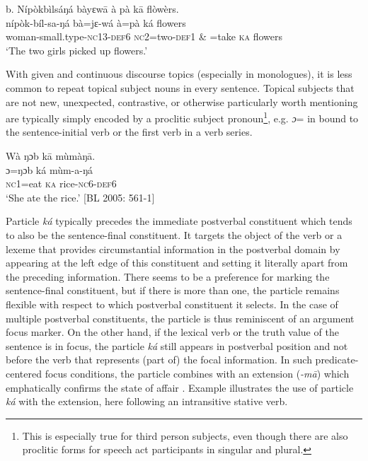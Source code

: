 \documentclass[output=paper]{langsci/langscibook}
\begin{document}
\ea
\glll   \textup{b.}  Nípòkbìlsáŋá  bàyɛw\={a}  à  pà  k\={a}  flòwèrs.\\
     nípòk-bíl-sa-ŋá  bà=jɛ-wá  à=pà  ká  flowers\\
     woman-small.type-\textsc{nc}13-\textsc{def}6  \textsc{nc}2=two-\textsc{def}1  \& =take  \textsc{ka}  flowers\\
    ‘The two girls picked up flowers.’ \citep[271]{Schwarz2009}
\z

With given and continuous discourse topics (especially in monologues), it is less common to repeat topical subject nouns in every sentence. Topical subjects that are not new, unexpected, contrastive, or otherwise particularly worth mentioning are typically simply encoded by a proclitic subject pronoun\footnote{ This is especially true for third person subjects, even though there are also proclitic forms for speech act participants in singular and plural. }, e.g. \textit{ɔ}= in  bound to the sentence-initial verb or the first verb in a verb series. 

\ea
\glll \textup{}  Wà ŋɔb  k\={a}  mùmàŋ\={a}.\\
  \textup{ɔ=ŋɔb    ká  mùm-a-ŋá}\\
     \textsc{nc1}=eat  \textsc{ka}  rice-\textsc{nc}6-\textsc{def}6\\
\glt ‘She ate the rice.’ [BL  2005: 561-1]
\z

Particle \textit{ká }typically precedes the immediate postverbal constituent which tends to also be the sentence-final constituent. It targets the object of the verb or a lexeme that provides circumstantial information in the postverbal domain by appearing at the left edge of this constituent and setting it literally apart from the preceding information. There seems to be a preference for marking the sentence-final constituent, but if there is more than one, the particle remains flexible with respect to which postverbal constituent it selects. In the case of multiple postverbal constituents, the particle is thus reminiscent of an argument focus marker. On the other hand, if the lexical verb or the truth value of the sentence is in focus, the particle \textit{ká }still appears in postverbal position and not before the verb that represents (part of) the focal information. In such predicate-centered focus conditions, the particle combines with an extension (\textit{{}-m\={a}}) which emphatically confirms the state of affair \citep{Schwarz2010b}. Example  illustrates the use of particle \textit{ká }with the extension, here following an intransitive stative verb.
\end{document}

